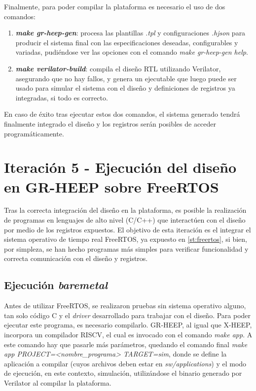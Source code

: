 Finalmente, para poder compilar la plataforma es necesario el uso de dos comandos:

\begin{enumerate}
    \item \emph{\textbf{make gr-heep-gen}}: procesa las plantillas \emph{.tpl} y configuraciones \emph{.hjson} para producir el sistema final con las especificaciones deseadas, configurables y variadas, pudiéndose ver las opciones con el comando \emph{make gr-heep-gen help}.
    \item \emph{\textbf{make verilator-build}}: compila el diseño RTL utilizando Verilator, asegurando que no hay fallos, y genera un ejecutable que luego puede ser usado para simular el sistema con el diseño y definiciones de registros ya integradas, si todo es correcto.
\end{enumerate}

En caso de éxito tras ejecutar estos dos comandos, el sistema generado tendrá finalmente integrado el diseño y los registros serán posibles de acceder programáticamente.

\section{Iteración 5 - Ejecución del diseño en GR-HEEP sobre FreeRTOS}
Tras la correcta integración del diseño en la plataforma, es posible la realización de programas en lenguajes de alto nivel (C/C++) que interactúen con el diseño por medio de los registros expuestos. El objetivo de esta iteración es el integrar el sistema operativo de tiempo real FreeRTOS, ya expuesto en \ref{st:freertos}, si bien, por simpleza, se han hecho programas más simples para verificar funcionalidad y correcta comunicación con el diseño y registros. 

\subsection{Ejecución \textit{baremetal}}
Antes de utilizar FreeRTOS, se realizaron pruebas sin sistema operativo alguno, tan solo código C y el \emph{driver} desarrollado para trabajar con el diseño. Para poder ejecutar este programa, es necesario compilarlo. GR-HEEP, al igual que X-HEEP, incorpora un compilador RISCV, el cual es invocado con el comando \emph{make app}. A este comando hay que pasarle más parámetros, quedando el comando final \emph{make app PROJECT=<nombre\_programa> TARGET=sim}, donde se define la aplicación a compilar (cuyos archivos deben estar en \emph{sw/applications}) y el modo de ejecución, en este contexto, simulación, utilizándose el binario generado por Verilator al compilar la plataforma.

